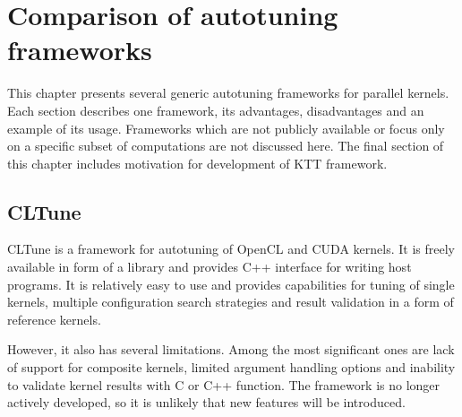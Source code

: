 \documentclass
[
    digital, %
    oneside, %
    table, %
    nolof, %
    nolot, %
    nocover %
]{fithesis3}
\begin{document}
\chapter{Comparison of autotuning frameworks}
This chapter presents several generic autotuning frameworks for parallel kernels. Each section describes one framework, its advantages, disadvantages
and an example of its usage. Frameworks which are not publicly available or focus only on a specific subset of computations are not discussed here.
The final section of this chapter includes motivation for development of KTT framework.

\section{CLTune}
CLTune \cite{cltune} is a framework for autotuning of OpenCL and CUDA kernels. It is freely available in form of a library and provides C++ interface
for writing host programs. It is relatively easy to use and provides capabilities for tuning of single kernels, multiple configuration search
strategies and result validation in a form of reference kernels.

However, it also has several limitations. Among the most significant ones are lack of support for composite kernels, limited argument handling
options and inability to validate kernel results with C or C++ function. The framework is no longer actively developed, so it is unlikely that new
features will be introduced.
\end{document}
